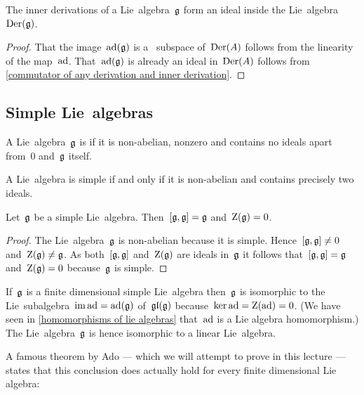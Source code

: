 \begin{corollary}
  \label{inner derivations are an ideal}
  The inner derivations of a Lie~algebra~$\mathfrak{g}$ form an ideal inside the Lie~algebra~$\operatorname{Der}(\mathfrak{g})$.
\end{corollary}

\begin{proof}
  That the image~$\operatorname{ad}(\mathfrak{g})$ is a~{\linear{$\kf$}} subspace of~$\operatorname{Der}(A)$ follows from the linearity of the map~$\operatorname{ad}$.
  That~$\operatorname{ad}(\mathfrak{g})$ is already an ideal in~$\operatorname{Der}(A)$ follows from \cref{commutator of any derivation and inner derivation}.
\end{proof}







\subsection{Simple Lie~algebras}


\begin{definition}
 A Lie~algebra~$\mathfrak{g}$ is  if it is non-abelian, nonzero and contains no ideals apart from~$0$ and~$\mathfrak{g}$ itself.
\end{definition}


\begin{remark}
  A Lie~algebra is simple if and only if it is non-abelian and contains precisely two ideals.
\end{remark}


\begin{lemma}
 Let~$\mathfrak{g}$ be a simple Lie~algebra.
 Then~$[\mathfrak{g}, \mathfrak{g}] = \mathfrak{g}$ and~$\operatorname{Z}(\mathfrak{g}) = 0$.
\end{lemma}


\begin{proof}
 The Lie~algebra~$\mathfrak{g}$ is non-abelian because it is simple.
 Hence~$[\mathfrak{g}, \mathfrak{g}] \neq 0$ and~$\operatorname{Z}(\mathfrak{g}) \neq \mathfrak{g}$.
 As both~$[\mathfrak{g}, \mathfrak{g}]$ and~$\operatorname{Z}(\mathfrak{g})$ are ideals in~$\mathfrak{g}$ it follows that~$[\mathfrak{g}, \mathfrak{g}] = \mathfrak{g}$ and~$\operatorname{Z}(\mathfrak{g}) = 0$ because~$\mathfrak{g}$ is simple.
\end{proof}


\begin{remark}
  If~$\mathfrak{g}$ is a finite dimensional simple Lie~algebra then~$\mathfrak{g}$ is isomorphic to the Lie~subalgebra~$\operatorname{im} \operatorname{ad} = \operatorname{ad}(\mathfrak{g})$ of~$\mathfrak{gl}(\mathfrak{g})$ because~$\ker \operatorname{ad} = \operatorname{Z}(\operatorname{ad}) = 0$.
  (We have seen in \cref{homomorphisms of lie algebras} that~$\operatorname{ad}$ is a Lie algebra homomorphism.)
  The Lie~algebra~$\mathfrak{g}$ is hence isomorphic to a linear Lie~algebra.
  
  A famous theorem by Ado --- which we will attempt to prove in this lecture --- states that this conclusion does actually hold for every finite dimensional Lie algebra:
\end{remark}


